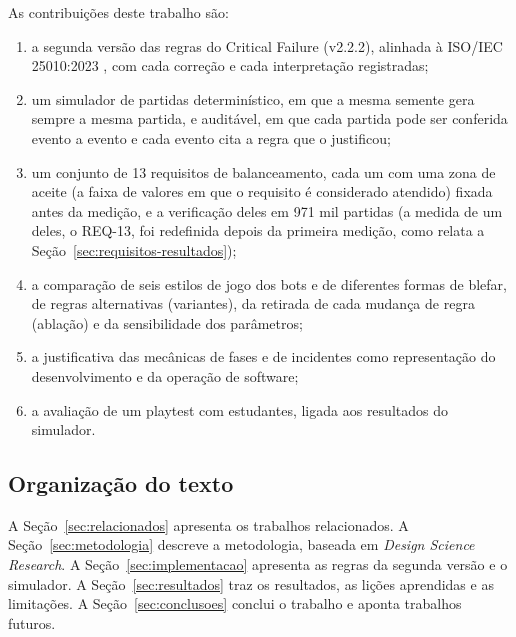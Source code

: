 As contribuições deste trabalho são:
\begin{enumerate}
  \item a segunda versão das regras do Critical Failure (v2.2.2), alinhada à ISO/IEC 25010:2023
    \cite{iso25010}, com cada correção e cada interpretação registradas;
  \item um simulador de partidas determinístico, em que a mesma semente gera sempre a mesma partida, e
    auditável, em que cada partida pode ser conferida evento a evento e cada evento cita a regra que o
    justificou;
  \item um conjunto de 13 requisitos de balanceamento, cada um com uma zona de aceite (a faixa de valores em que
    o requisito é considerado atendido) fixada antes da medição, e a verificação deles em 971 mil partidas
    (a medida de um deles, o REQ-13, foi redefinida depois da primeira medição, como relata a
    Seção~\ref{sec:requisitos-resultados});
  \item a comparação de seis estilos de jogo dos bots e de diferentes formas de blefar, de regras alternativas
    (variantes), da retirada de cada mudança de regra (ablação) e da sensibilidade dos parâmetros;
  \item a justificativa das mecânicas de fases e de incidentes como representação do desenvolvimento e da
    operação de software;
  \item a avaliação de um playtest com estudantes, ligada aos resultados do simulador.
\end{enumerate}

\subsection{Organização do texto}

A Seção~\ref{sec:relacionados} apresenta os trabalhos relacionados. A Seção~\ref{sec:metodologia} descreve a
metodologia, baseada em \emph{Design Science Research}. A Seção~\ref{sec:implementacao} apresenta as regras da
segunda versão e o simulador. A Seção~\ref{sec:resultados} traz os resultados, as lições aprendidas e as
limitações. A Seção~\ref{sec:conclusoes} conclui o trabalho e aponta trabalhos futuros.
